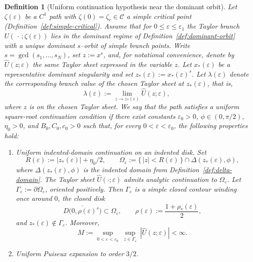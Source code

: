\documentclass[10pt,a4paper]{amsart}
\newtheorem{definition}{Definition}
\begin{document}
\begin{definition}[Uniform continuation hypothesis near the dominant orbit]\label{def:uniform-delta}
	Let $\zeta(\varepsilon)$ be a $C^1$ path with $\zeta(0)=\zeta_c\in\mathcal C$ a simple critical point
	(Definition~\ref{def:simple-critical}). Assume that for $0\le\varepsilon\le\varepsilon_1$ the Taylor branch
	$U(\,\cdot\,;\zeta(\varepsilon))$ lies in the dominant regime of Definition~\ref{def:dominant-orbit} with a unique
	dominant $s$--orbit of simple branch points.
	Write $s=\gcd(s_1,\dots,s_N)$, set $z:=x^{s}$, and, for notational convenience, denote by
	$\widehat U(z;\varepsilon)$ the same Taylor sheet expressed in the variable $z$.
	Let $x_*(\varepsilon)$ be a representative dominant singularity and set $z_*(\varepsilon):=x_*(\varepsilon)^s$.
	Let $\lambda(\varepsilon)$ denote the corresponding branch value of the chosen Taylor sheet at $z_*(\varepsilon)$, that is,
	\[
		\lambda(\varepsilon):=
		\lim_{z\to z_*(\varepsilon)}\widehat U(z;\varepsilon),
	\]
	where $z$ is on the chosen Taylor sheet.
	We say that the path satisfies a \emph{uniform square-root continuation
condition} if there exist constants \(\varepsilon_0>0\),
\(\phi\in(0,\pi/2)\), \(\eta_0>0\), and \(B_0,C_0,c_0>0\) such that, for every
\(0<\varepsilon<\varepsilon_0\), the following properties hold:
	\begin{enumerate}[label=(U\arabic*),leftmargin=2.5em]
		    \item\label{U1} \emph{Uniform indented-domain continuation on an indented disk.}
		      Set
		      \[
			      R(\varepsilon):=|z_*(\varepsilon)|+\eta_0/2,
			      \qquad
			      \Omega_\varepsilon:=\{\,|z|<R(\varepsilon)\,\}\cap \Delta(z_*(\varepsilon),\phi),
		      \]
			    where \(\Delta(z_*(\varepsilon),\phi)\) is the indented domain from
		      Definition~\ref{def:delta-domain}. The Taylor sheet
		      \(\widehat U(\cdot;\varepsilon)\) admits analytic continuation to
		      \(\Omega_\varepsilon\). Let \(\Gamma_\varepsilon:=\partial\Omega_\varepsilon\),
		      oriented positively. Then \(\Gamma_\varepsilon\) is a simple closed contour
		      winding once around \(0\), the closed disk
		      \[
			      \overline{D\bigl(0,\rho(\varepsilon)^s\bigr)}
			      \subset \Omega_\varepsilon,
			      \qquad
			      \rho(\varepsilon):=\frac{1+\rho_*(\varepsilon)}{2},
		      \]
			  and \(z_*(\varepsilon)\notin \Gamma_\varepsilon\).
		      Moreover,
		      \[
			      M:=\sup_{0<\varepsilon<\varepsilon_0}\ \sup_{z\in\Gamma_\varepsilon}\ |\widehat U(z;\varepsilon)|<\infty.
		      \]
		\item\label{U2} \emph{Uniform Puiseux expansion to order $3/2$.}

\end{enumerate}
\end{definition}
\end{document}
